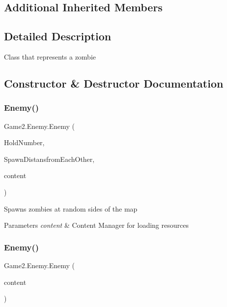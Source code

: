 \subsection*{Additional Inherited Members}


\subsection{Detailed Description}
Class that represents a zombie 



\subsection{Constructor \& Destructor Documentation}
\mbox{\label{class_game2_1_1_enemy_ac96eace4797abdd8d99c0e67348f1f7d}} 
\subsubsection{\texorpdfstring{Enemy()}{Enemy()}\hspace{0.1cm}{\footnotesize\ttfamily [1/2]}}
{\footnotesize\ttfamily Game2.\+Enemy.\+Enemy (\begin{DoxyParamCaption}\item[{int}]{Hold\+Number,  }\item[{int}]{Spawn\+Distansfrom\+Each\+Other,  }\item[{Content\+Manager}]{content }\end{DoxyParamCaption})}



Spawns zombies at random sides of the map 


\begin{DoxyParams}{Parameters}
{\em content} & Content Manager for loading resources\\
\hline
\end{DoxyParams}
\mbox{\label{class_game2_1_1_enemy_abb82db1812e2fa2b074f0bc0c53471d1}} 
\subsubsection{\texorpdfstring{Enemy()}{Enemy()}\hspace{0.1cm}{\footnotesize\ttfamily [2/2]}}
{\footnotesize\ttfamily Game2.\+Enemy.\+Enemy (\begin{DoxyParamCaption}\item[{Content\+Manager}]{content }\end{DoxyParamCaption})}




